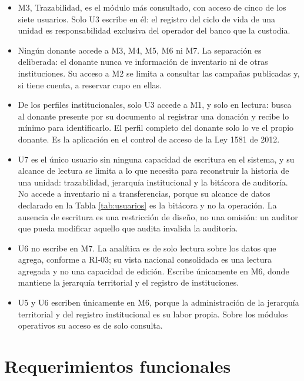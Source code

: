\documentclass[11pt,a4paper]{article}
\begin{document}
\begin{itemize}
\item M3, Trazabilidad, es el módulo más consultado, con acceso de cinco de los siete usuarios. Solo U3 escribe en él: el registro del ciclo de vida de una unidad es responsabilidad exclusiva del operador del banco que la custodia.
\item Ningún donante accede a M3, M4, M5, M6 ni M7. La separación es deliberada: el donante nunca ve información de inventario ni de otras instituciones. Su acceso a M2 se limita a consultar las campañas publicadas y, si tiene cuenta, a reservar cupo en ellas.
\item De los perfiles institucionales, solo U3 accede a M1, y solo en lectura: busca al donante presente por su documento al registrar una donación y recibe lo mínimo para identificarlo. El perfil completo del donante solo lo ve el propio donante. Es la aplicación en el control de acceso de la Ley 1581 de 2012.
\item U7 es el único usuario sin ninguna capacidad de escritura en el sistema, y su alcance de lectura se limita a lo que necesita para reconstruir la historia de una unidad: trazabilidad, jerarquía institucional y la bitácora de auditoría. No accede a inventario ni a transferencias, porque su alcance de datos declarado en la Tabla \ref{tab:usuarios} es la bitácora y no la operación. La ausencia de escritura es una restricción de diseño, no una omisión: un auditor que pueda modificar aquello que audita invalida la auditoría.
\item U6 no escribe en M7. La analítica es de solo lectura sobre los datos que agrega, conforme a RI-03; su vista nacional consolidada es una lectura agregada y no una capacidad de edición. Escribe únicamente en M6, donde mantiene la jerarquía territorial y el registro de instituciones.
\item U5 y U6 escriben únicamente en M6, porque la administración de la jerarquía territorial y del registro institucional es su labor propia. Sobre los módulos operativos su acceso es de solo consulta.
\end{itemize}

\section{Requerimientos funcionales}
\label{sec:rf}
\end{document}
